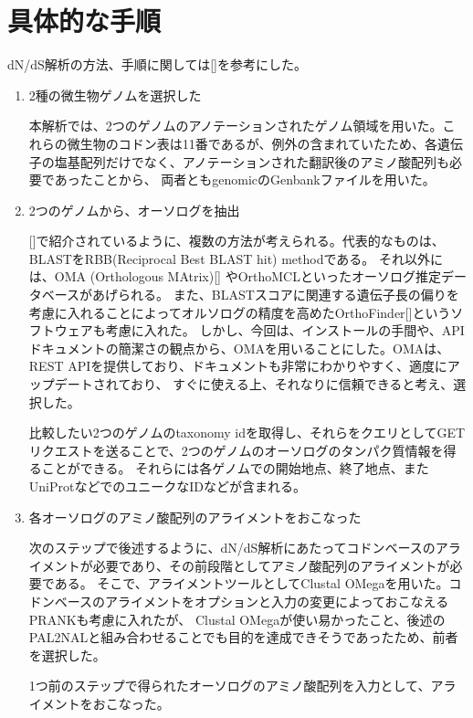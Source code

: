 \documentclass[a4j,12pt]{jreport}
\begin{document}
\section{具体的な手順}
    dN/dS解析の方法、手順に関しては[]を参考にした。
    \begin{enumerate}
        \item 2種の微生物ゲノムを選択した

        本解析では、2つのゲノムのアノテーションされたゲノム領域を用いた。これらの微生物のコドン表は11番であるが、例外の含まれていたため、各遺伝子の塩基配列だけでなく、アノテーションされた翻訳後のアミノ酸配列も必要であったことから、
        両者ともgenomicのGenbankファイルを用いた。
        \item 2つのゲノムから、オーソログを抽出
        
        []で紹介されているように、複数の方法が考えられる。代表的なものは、BLASTをRBB(Reciprocal Best BLAST hit) methodである。
        それ以外には、OMA (Orthologous MAtrix)[] やOrthoMCLといったオーソログ推定データベースがあげられる。
        また、BLASTスコアに関連する遺伝子長の偏りを考慮に入れることによってオルソログの精度を高めたOrthoFinder[]というソフトウェアも考慮に入れた。
        しかし、今回は、インストールの手間や、APIドキュメントの簡潔さの観点から、OMAを用いることにした。OMAは、REST APIを提供しており、ドキュメントも非常にわかりやすく、適度にアップデートされており、
        すぐに使える上、それなりに信頼できると考え、選択した。

        比較したい2つのゲノムのtaxonomy idを取得し、それらをクエリとしてGETリクエストを送ることで、2つのゲノムのオーソログのタンパク質情報を得ることができる。
        それらには各ゲノムでの開始地点、終了地点、またUniProtなどでのユニークなIDなどが含まれる。
        
        \item 各オーソログのアミノ酸配列のアライメントをおこなった
        
        次のステップで後述するように、dN/dS解析にあたってコドンベースのアライメントが必要であり、その前段階としてアミノ酸配列のアライメントが必要である。
        そこで、アライメントツールとしてClustal OMegaを用いた。コドンベースのアライメントをオプションと入力の変更によっておこなえるPRANKも考慮に入れたが、
        Clustal OMegaが使い易かったこと、後述のPAL2NALと組み合わせることでも目的を達成できそうであったため、前者を選択した。

        1つ前のステップで得られたオーソログのアミノ酸配列を入力として、アライメントをおこなった。


\end{enumerate}
\end{document}
